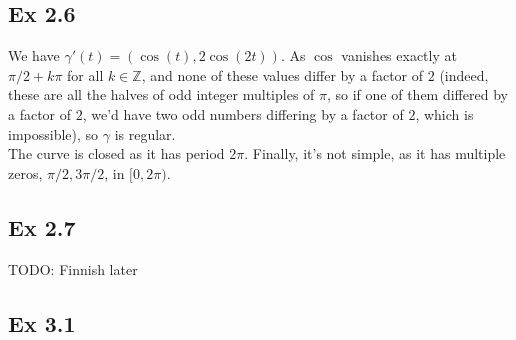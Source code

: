 \documentclass{article}
\theoremstyle{definition}
\newcommand{\Z}{\mathbb{Z}}
\begin{document}
\subsection*{Ex 2.6}

We have $\gamma'(t) = (\cos(t), 2 \cos(2t))$. As $\cos$ vanishes exactly at
$\pi/2 + k\pi$ for all $k \in \Z$, and none of these values differ by a factor
of $2$ (indeed, these are all the halves of odd integer multiples of $\pi$, so
if one of them differed by a factor of $2$, we'd have two odd numbers differing
by a factor of $2$, which is impossible), so $\gamma$ is regular. \\

The curve is closed as it has period $2\pi$. Finally, it's not simple, as it
has multiple zeros, $\pi/2, 3\pi/2$, in $[0, 2\pi)$.

\subsection*{Ex 2.7}

TODO: Finnish later

\subsection*{Ex 3.1}
\end{document}
